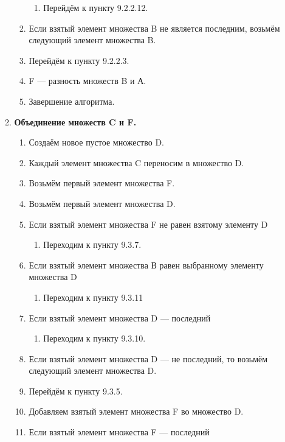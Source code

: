 \documentclass[a4paper,12pt]{extarticle}
\begin{document}
\begin{enumerate}
\begin{enumerate}[label*=\arabic*.]
\begin{enumerate}[label*=\arabic*.]
      \begin{enumerate}[label*=\arabic*.]
        \item Перейдём к пункту 9.2.2.12.
      \end{enumerate}
      \item Если взятый элемент множества B не является последним, возьмём следующий элемент множества B.
      \item Перейдём к пункту 9.2.2.3.
      \item F — разность множеств B и А.
      \item Завершение алгоритма.
    \end{enumerate}
    \item\textbf{Объединение множеств C и F.}
    \begin{enumerate}[label*=\arabic*.]
      \item Создаём новое пустое множество D.
      \item Каждый элемент множества C переносим в множество D.
      \item Возьмём первый элемент множества F.
      \item Возьмём первый элемент множества D.
      \item Если взятый элемент множества F не равен взятому элементу D
      \begin{enumerate}[label*=\arabic*.]
        \item Переходим к пункту 9.3.7.
      \end{enumerate}
      \item Если взятый элемент множества В равен выбранному элементу множества D
      \begin{enumerate}[label*=\arabic*.]
        \item Переходим к пункту 9.3.11
      \end{enumerate}
      \item Если взятый элемент множества D — последний
      \begin{enumerate}[label*=\arabic*.]
        \item Переходим к пункту 9.3.10.
      \end{enumerate}
      \item Если взятый элемент множества D — не последний, то возьмём следующий элемент множества D.
      \item Перейдём к пункту 9.3.5.
      \item Добавляем взятый элемент множества F во множество D.
      \item Если взятый элемент множества F — последний

\end{enumerate}
\end{enumerate}
\end{enumerate}
\end{document}
